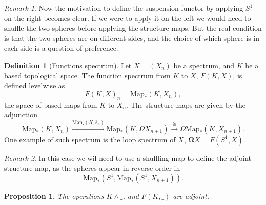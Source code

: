 \documentclass[a4paper,english,11pt]{article}
\theoremstyle{definition}
\newtheorem{Def}{Definition}
\theoremstyle{plain}
\newtheorem{prop}{Proposition}[section]
\theoremstyle{remark}
\newtheorem{rem}{\color{red}Remark}
\newcommand{\Map}{\text{Map}}
\newcommand{\lspec}{\mathbf{\Omega}}
\newcommand{\astruc}{\bar{\varepsilon}}
\begin{document}
\begin{rem}
  Now the motivation to define the suspension functor by applying \(S^1\) on the right becomes clear. If we were to apply it on the left we would need to shuffle the two spheres before applying the structure maps. But the real condition is that the two spheres are on different sides, and the choice of which sphere is in each side is a question of {\color{red} preference}.
\end{rem}
\begin{Def}[Functions spectrum]
  Let \(X=(X_n)\) be a spectrum, and \(K\) be a based topological space. The function spectrum from \(K\) to \(X\), \(F(K,X)\), is defined levelwise as
  \[F(K,X)_n= \Map_\ast(K,X_n),\]
  the space of based maps from \(K\) to \(X_n\). The structure maps are given by the adjunction
  \[\Map_\ast(K,X_n)\xrightarrow{\Map_\ast(K,\astruc_n)}\Map_\ast(K,\Omega X_{n+1})\xrightarrow{\cong}\Omega \Map_\ast(K,X_{n+1}).\]
  One example of such spectrum is the loop spectrum of \(X\), \(\lspec X=F(S^1,X)\).
\end{Def}
\begin{rem}
  In this case we wil need to use a shuffling map to define the adjoint structure map, as the spheres appear in reverse order in 
  \[\Map_\ast(S^1,\Map_\ast(S^1,X_{n+1})).\] 
\end{rem}
\begin{prop}
  The operations \(K\wedge\_\), and \(F(K,\_)\) are adjoint.  
\end{prop}
\end{document}
